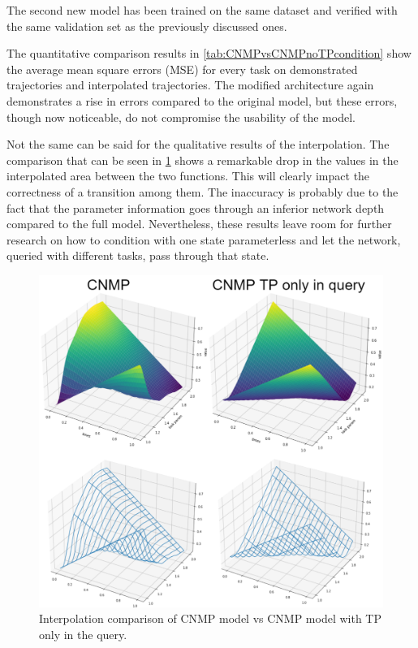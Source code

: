 The second new model has been trained on the same dataset and verified with the same validation set as the previously discussed ones.

The quantitative comparison results in \cref{tab:CNMPvsCNMPnoTPcondition} show the average mean square errors (MSE) for every task on demonstrated trajectories and interpolated trajectories. The modified architecture again demonstrates a rise in errors compared to the original model, but these errors, though now noticeable, do not compromise the usability of the model.

Not the same can be said for the qualitative results of the interpolation. The comparison that can be seen in \cref{fig:comparisonCNMPvsCNMPonlyTPquery} shows a remarkable drop in the values in the interpolated area between the two functions. This will clearly impact the correctness of a transition among them. The inaccuracy is probably due to the fact that the parameter information goes through an inferior network depth compared to the full model.  
Nevertheless, these results leave room for further research on how to condition with one state parameterless and let the network, queried with different tasks, pass through that state.

\begin{figure}
    \centering
    \includegraphics[width=0.8\linewidth]{figures/comparisonCNMPvsCNMPonlyTPquery.png}
    \caption{ Interpolation comparison of CNMP model vs CNMP model with TP only in the query. }
    \label{fig:comparisonCNMPvsCNMPonlyTPquery}
\end{figure}


